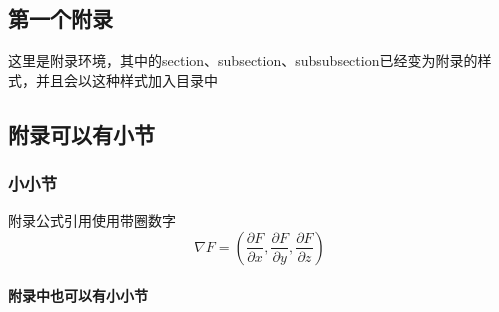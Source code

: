 \documentclass{CustGraduPaper}
\begin{document}


\begin{appendices}
	\chapter{第一个附录}
	这里是附录环境，其中的section、subsection、subsubsection已经变为附录的样式，并且会以这种样式加入目录中
	\section{附录可以有小节}
	\subsection{小小节}
	附录公式引用使用带圈数字
	\begin{equation}\label{eq:appendices}
		\nabla F = (
		\frac{\partial F}{\partial x},
		\frac{\partial F}{\partial y},
		\frac{\partial F}{\partial z})
	\end{equation}
	\subsubsection{附录中也可以有小小节}\label{apxsubsubsec:appendix}
\end{appendices}
\end{document}
